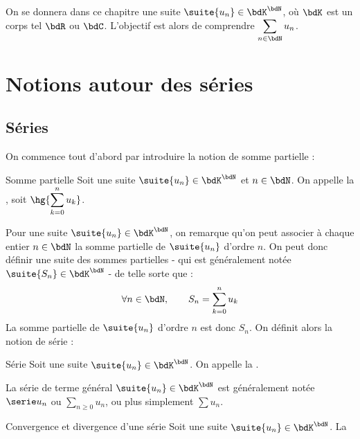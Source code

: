 \documentclass[a4paper,french,bookmarks]{article}
\begin{document}

\initcours{}

On se donnera dans ce chapitre une suite $\suite{u_n} \in \bdK^\bdN$, où $\bdK$ est un corps tel $\bdR$ ou $\bdC$. L'objectif est alors de comprendre $\displaystyle\sum_{n \in \bdN} u_n$.

\section{Notions autour des séries}

\subsection{Séries}

On commence tout d'abord par introduire la notion de somme partielle :

\begin{definition}{Somme partielle}{}
    Soit une suite $\suite{u_n} \in \bdK^\bdN$ et $n \in \bdN$. On appelle  la , soit $\hg{\displaystyle \sum_{k=0}^n u_k}$.
\end{definition}

Pour une suite $\suite{u_n} \in \bdK^\bdN$, on remarque qu'on peut associer à chaque entier $n \in \bdN$ la somme partielle de $\suite{u_n}$ d'ordre $n$. On peut donc définir une suite des sommes partielles - qui est généralement notée $\suite{S_n} \in \bdK^\bdN$ - de telle sorte que :
%
\[ \forall n \in \bdN,\qquad S_n = \sum_{k=0}^n u_k\]
%
La somme partielle de $\suite{u_n}$ d'ordre $n$ est donc $S_n$. On définit alors la notion de série :

\begin{definition}{Série}{}
    Soit une suite $\suite{u_n} \in \bdK^\bdN$. On appelle  la .
\end{definition}

La série de terme général $\suite{u_n} \in \bdK^\bdN$ est généralement notée $\serie u_n$ ou $\textstyle{\sum\limits_{n \geq 0} u_n}$, ou plus simplement $\textstyle{\sum u_n}$.

\begin{definition}{Convergence et divergence d'une série}
    Soit une suite $\suite{u_n} \in \bdK^\bdN$. La
\end{definition}
\end{document}
